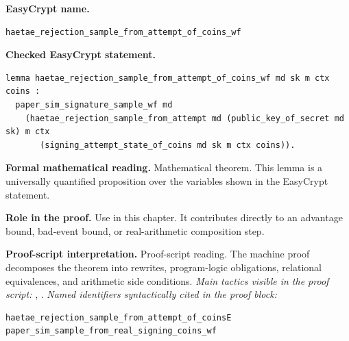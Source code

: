 \begin{formaltheorem}
\noindent\textbf{EasyCrypt name.}
\begin{lstlisting}[language=EasyCrypt,basicstyle=\ttfamily\scriptsize]
haetae_rejection_sample_from_attempt_of_coins_wf
\end{lstlisting}
\noindent\textbf{Checked EasyCrypt statement.}
\begin{lstlisting}[language=EasyCrypt,basicstyle=\ttfamily\scriptsize]
lemma haetae_rejection_sample_from_attempt_of_coins_wf md sk m ctx coins :
  paper_sim_signature_sample_wf md
    (haetae_rejection_sample_from_attempt md (public_key_of_secret md sk) m ctx
       (signing_attempt_state_of_coins md sk m ctx coins)).
\end{lstlisting}
\noindent\textbf{Formal mathematical reading.}
Mathematical theorem. This lemma is a universally quantified proposition over the variables shown in the EasyCrypt statement.

\noindent\textbf{Role in the proof.}
Use in this chapter. It contributes directly to an advantage bound, bad-event bound, or real-arithmetic composition step.

\noindent\textbf{Proof-script interpretation.}
Proof-script reading. The machine proof decomposes the theorem into rewrites, program-logic obligations, relational equivalences, and arithmetic side conditions.
\emph{Main tactics visible in the proof script:} , .
\emph{Named identifiers syntactically cited in the proof block:}
\begin{lstlisting}[language=EasyCrypt,basicstyle=\ttfamily\scriptsize]
haetae_rejection_sample_from_attempt_of_coinsE
paper_sim_sample_from_real_signing_coins_wf
\end{lstlisting}

\end{formaltheorem}

